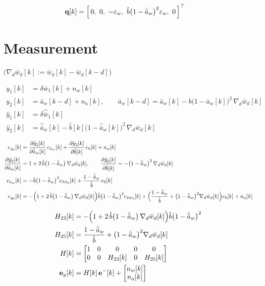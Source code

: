 \documentclass[11pt,a4paper,fontset=none]{ctexart}
\newcommand{\ba}{\bar{a}}
\newcommand{\bw}{\bar{w}}
\newcommand{\ah}{\hat{\ba}_w}
\newcommand{\bh}{\hat{b}}
\begin{document}
\begin{align*}
\mathbf{q}[k] &= \Bigl[\,0,\ 0,\ -\varepsilon_w,\ \bh\bigl(1-\ah\bigr)^{2}\varepsilon_w,\ 0\,\Bigr]^{\top}
\end{align*}

\section{Measurement}

$\bigl(\nabla_d\bw_d[k] := \bw_d[k] - \bw_d[k-d]\bigr)$

\begin{align*}
y_1[k]     &= \delta\bw_1[k] + n_w[k] \\
y_2[k]     &= \ba_w[k-d] + n_a[k], \qquad
\ba_w[k-d]  = \ba_w[k] - b\bigl(1-\ba_w[k]\bigr)^{2}\,\nabla_d\bw_d[k] \\
\hat y_1[k] &= \delta\hat{\bw}_1[k] \\
\hat y_2[k] &= \ah[k] - \bh[k]\bigl(1-\ah[k]\bigr)^{2}\,\nabla_d\bw_d[k]
\end{align*}

\begin{align*}
e_{y_2}[k] &= \frac{\partial \hat y_2[k]}{\partial \ah[k]}\,e_{\ba_w}[k] + \frac{\partial \hat y_2[k]}{\partial \bh[k]}\,e_b[k] + n_a[k] \\
\frac{\partial \hat y_2[k]}{\partial \ah[k]} &= 1 + 2\,\bh\bigl(1-\ah\bigr)\,\nabla_d\bw_d[k], \qquad
\frac{\partial \hat y_2[k]}{\partial \bh[k]} = -\bigl(1-\ah\bigr)^{2}\,\nabla_d\bw_d[k] \\
e_{\ba_w}[k] &= -\bh\bigl(1-\ah\bigr)^{2}e_{\delta\bw_3}[k] + \frac{1-\ah}{\bh}\,e_b[k] \\
e_{y_2}[k] &= -\Bigl(1 + 2\,\bh\bigl(1-\ah\bigr)\,\nabla_d\bw_d[k]\Bigr)\bh\bigl(1-\ah\bigr)^{2}e_{\delta\bw_3}[k]
              + \Bigl(\frac{1-\ah}{\bh} + \bigl(1-\ah\bigr)^{2}\nabla_d\bw_d[k]\Bigr)e_b[k] + n_a[k]
\end{align*}

\begin{align*}
H_{23}[k] &= -\Bigl(1 + 2\,\bh\bigl(1-\ah\bigr)\,\nabla_d\bw_d[k]\Bigr)\bh\bigl(1-\ah\bigr)^{2} \\
H_{25}[k] &= \frac{1-\ah}{\bh} + \bigl(1-\ah\bigr)^{2}\nabla_d\bw_d[k] \\
H[k]      &= \begin{bmatrix} 1 & 0 & 0 & 0 & 0 \\ 0 & 0 & H_{23}[k] & 0 & H_{25}[k] \end{bmatrix} \\
\mathbf{e}_y[k] &= H[k]\,\mathbf{e}^{-}[k] + \begin{bmatrix} n_w[k] \\ n_a[k] \end{bmatrix}
\end{align*}
\end{document}
